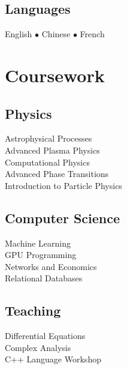 \documentclass[]{yubo-resume-openfont}
\begin{document}
\begin{minipage}[t]{0.33\textwidth}
    \subsection{Languages}
    English $\bullet$ Chinese $\bullet$ French
    \sectionsep




\section{Coursework}
    \subsection{Physics}
        Astrophysical Processes\\
        Advanced Plasma Physics\\
        Computational Physics\\
        Advanced Phase Transitions\\
        Introduction to Particle Physics\\
    \sectionsep
    \subsection{Computer Science}
        Machine Learning\\
        GPU Programming\\
        Networks and Economics\\
        Relational Databases
    \sectionsep

    \subsection{Teaching}
        Differential Equations\\
        Complex Analysis\\
        C++ Language Workshop
    \sectionsep

%
%

\end{minipage}
\hfill
\end{document}
